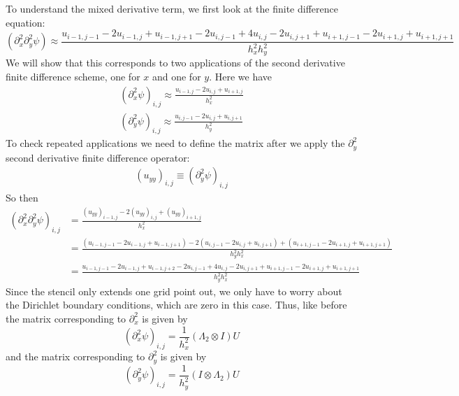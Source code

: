 \documentclass[reqno]{article}
\begin{document}
	To understand the mixed derivative term, we first look at the finite difference equation:
	\begin{equation}
		\left(\partial_x^2\partial_y^2 \psi\right) \approx \frac{u_{i-1,j-1} - 2u_{i-1,j} + u_{i-1,j+1} -2 u_{i,j-1} + 4u_{i,j} -2u_{i,j+1}+u_{i+1,j-1} - 2u_{i+1,j} + u_{i+1,j+1}}{h_x^2 h_y^2}
	\end{equation}
	We will show that this corresponds to two applications of the second derivative finite difference scheme, one for $x$ and one for $y$. Here we have
	\begin{align}
		\left(\partial_x^2 \psi\right)_{i, j} \approx \frac{u_{i - 1, j} - 2u_{i, j} + u_{i + 1, j}}{h_x^2} \\
		\left(\partial_y^2 \psi\right)_{i, j} \approx \frac{u_{i, j - 1} - 2u_{i, j} + u_{i, j + 1}}{h_y^2}
	\end{align}
	To check repeated applications we need to define the matrix after we apply the $\partial_y^2$ second derivative finite difference operator:
	\begin{align}
		\left(u_{yy}\right)_{i, j} \equiv \left(\partial_y^2\psi\right)_{i, j}
	\end{align}
	So then
	\begin{align}
		\left(\partial_x^2 \partial_y^2 \psi\right)_{i, j} &= \frac{\left( u_{yy} \right)_{i - 1, j} - 2\left( u_{yy} \right)_{i, j}  + \left( u_{yy} \right)_{i + 1, j}}{h_x^2} \\
		&= \frac{ \left( u_{i - 1, j - 1} - 2u_{i - 1, j} + u_{i - 1, j + 1} \right) - 2\left( u_{i, j - 1} - 2u_{i, j} + u_{i, j + 1} \right) + \left( u_{i + 1, j - 1} - 2u_{i + 1, j} + u_{i + 1, j + 1} \right)}{h_y^2 h_x^2} \\
		&= \frac{ u_{i - 1, j - 1} - 2u_{i - 1, j} + u_{i - 1, j + 2} - 2u_{i, j - 1} + 4u_{i, j} - 2u_{i, j + 1} + u_{i + 1, j - 1} - 2u_{i + 1, j} + u_{i + 1, j + 1}}{h_y^2 h_x^2}
 	\end{align}
	Since the stencil only extends one grid point out, we only have to worry about the Dirichlet boundary conditions, which are zero in this case. Thus, like before the matrix corresponding to $\partial_x^2$ is given by
	\begin{equation}
		\left( \partial_x^2 \psi \right)_{i, j} = \frac{1}{h_x^2} \left( \Lambda_2 \otimes I \right) U
	\end{equation}
	and the matrix corresponding to $\partial_y^2$ is given by
	\begin{equation}
		\left( \partial_y^2 \psi \right)_{i, j} = \frac{1}{h_y^2} \left( I \otimes \Lambda_2 \right) U
	\end{equation}
\end{document}
